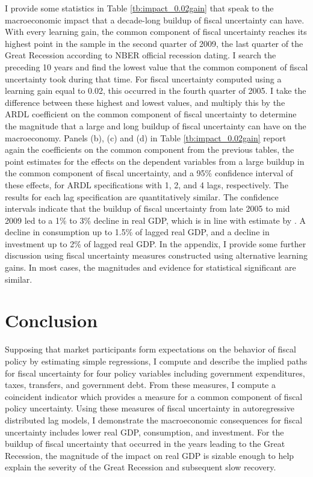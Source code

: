 \documentclass[11pt]{article}
\begin{document}
I provide some statistics in Table \ref{tb:impact_0.02gain} that speak to the macroeconomic impact that a decade-long buildup of fiscal uncertainty can have.  With every learning gain, the common component of fiscal uncertainty reaches its highest point in the sample in the second quarter of 2009, the last quarter of the Great Recession according to NBER official recession dating.  I search the preceding 10 years and find the lowest value that the common component of fiscal uncertainty took during that time.  For fiscal uncertainty computed using a learning gain equal to 0.02, this occurred in the fourth quarter of 2005.  I take the difference between these highest and lowest values, and multiply this by the ARDL coefficient on the common component of fiscal uncertainty to determine the magnitude that a large and long buildup of fiscal uncertainty can have on the macroeconomy.  Panels (b), (c) and (d) in Table \ref{tb:impact_0.02gain} report again the coefficients on the common component from the previous tables, the point estimates for the effects on the dependent variables from a large buildup in the common component of fiscal uncertainty, and a 95\% confidence interval of these effects, for ARDL specifications with 1, 2, and 4 lags, respectively.  The results for each lag specification are quantitatively similar.  The confidence intervals indicate that the buildup of fiscal uncertainty from late 2005 to mid 2009 led to a 1\% to 3\% decline in real GDP, which is in line with estimate by \cite{baker2013}.  A decline in consumption up to 1.5\% of lagged real GDP, and a decline in investment up to 2\% of lagged real GDP.  In the appendix, I provide some further discussion using fiscal uncertainty measures constructed using alternative learning gains.  In most cases, the magnitudes and evidence for statistical significant are similar.

\section{Conclusion}
Supposing that market participants form expectations on the behavior of fiscal policy by estimating simple regressions, I compute and describe the implied paths for fiscal uncertainty for four policy variables including government expenditures, taxes, transfers, and government debt.  From these measures, I compute a coincident indicator which provides a measure for a common component of fiscal policy uncertainty.  Using these measures of fiscal uncertainty in autoregressive distributed lag models, I demonstrate the macroeconomic consequences for fiscal uncertainty includes lower real GDP, consumption, and investment.  For the buildup of fiscal uncertainty that occurred in the years leading to the Great Recession, the magnitude of the impact on real GDP is sizable enough to help explain the severity of the Great Recession and subsequent slow recovery.
\end{document}
